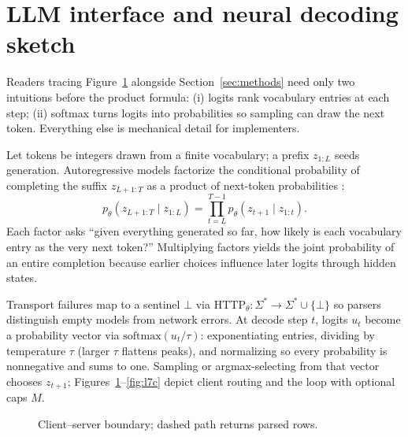 \documentclass[11pt,a4paper]{article}
\theoremstyle{remark}
\newcommand{\Sig}{\Sigma^\ast}
\begin{document}
\section{LLM interface and neural decoding sketch}
\label{app:llm}

Readers tracing Figure~\ref{fig:l7a} alongside Section~\ref{sec:methods} need only two intuitions before the product formula: (i) logits rank vocabulary entries at each step; (ii) softmax turns logits into probabilities so sampling can draw the next token. Everything else is mechanical detail for implementers.

Let tokens be integers drawn from a finite vocabulary; a prefix $z_{1:L}$ seeds generation. Autoregressive models factorize the conditional probability of completing the suffix $z_{L+1:T}$ as a product of next-token probabilities \citep{vaswani2017attention}:
\[
p_\theta(z_{L+1:T}\mid z_{1:L})=\prod_{t=L}^{T-1}p_\theta(z_{t+1}\mid z_{1:t}).
\]
Each factor asks ``given everything generated so far, how likely is each vocabulary entry as the very next token?'' Multiplying factors yields the joint probability of an entire completion because earlier choices influence later logits through hidden states.

Transport failures map to a sentinel $\bot$ via $\mathrm{HTTP}_\theta:\Sig\to\Sig\cup\{\bot\}$ so parsers distinguish empty models from network errors. At decode step $t$, logits $u_t$ become a probability vector via $\mathrm{softmax}(u_t/\tau)$: exponentiating entries, dividing by temperature $\tau$ (larger $\tau$ flattens peaks), and normalizing so every probability is nonnegative and sums to one. Sampling or argmax-selecting from that vector chooses $z_{t+1}$; Figures~\ref{fig:l7a}--\ref{fig:l7c} depict client routing and the loop with optional caps $M$.

\begin{figure}[htbp]
\centering
{}
\caption{Client--server boundary; dashed path returns parsed rows.}
\label{fig:l7a}
\end{figure}
\end{document}
